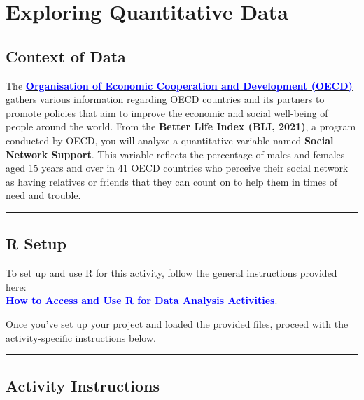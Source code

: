 \documentclass[oneside,openany]{book}
\begin{document}
\chapter{Exploring Quantitative Data}\label{activity-2---exploring-quantitative-data}

\section{Context of Data}\label{context-of-data-1}

The \href{http://www.oecd.org/about/}{\textcolor{blue}{\textbf{Organisation of Economic Cooperation and Development (OECD)}}} gathers various information regarding OECD countries and its partners to promote policies that aim to improve the economic and social well-being of people around the world. From the \textbf{Better Life Index (BLI, 2021)}, a program conducted by OECD, you will analyze a quantitative variable named \textbf{Social Network Support}. This variable reflects the percentage of males and females aged 15 years and over in 41 OECD countries who perceive their social network as having relatives or friends that they can count on to help them in times of need and trouble.

\begin{center}\rule{0.5\linewidth}{0.5pt}\end{center}

\section{R Setup}\label{r-setup-1}

To set up and use R for this activity, follow the general instructions provided here:\\
\hyperref[how-to-set-up-r-for-data-analysis-activities]{\textcolor{blue}{\textbf{How to Access and Use R for Data Analysis Activities}}}.

Once you've set up your project and loaded the provided files, proceed with the activity-specific instructions below.

\begin{center}\rule{0.5\linewidth}{0.5pt}\end{center}

\section{Activity Instructions}\label{activity-instructions-1}
\end{document}
